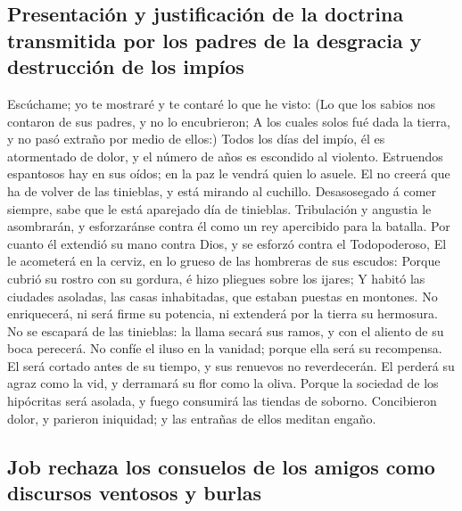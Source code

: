 \hypertarget{presentaciuxf3n-y-justificaciuxf3n-de-la-doctrina-transmitida-por-los-padres-de-la-desgracia-y-destrucciuxf3n-de-los-impuxedos}{%
\subsection{Presentación y justificación de la doctrina transmitida por
los padres de la desgracia y destrucción de los
impíos}\label{presentaciuxf3n-y-justificaciuxf3n-de-la-doctrina-transmitida-por-los-padres-de-la-desgracia-y-destrucciuxf3n-de-los-impuxedos}}

 Escúchame; yo te mostraré y te contaré lo que he visto:
 (Lo que los sabios nos contaron de sus padres, y no lo
encubrieron;  A los cuales solos fué dada la tierra, y no
pasó extraño por medio de ellos:)  Todos los días del
impío, él es atormentado de dolor, y el número de años es escondido al
violento.  Estruendos espantosos hay en sus oídos; en la
paz le vendrá quien lo asuele.  El no creerá que ha de
volver de las tinieblas, y está mirando al cuchillo. 
Desasosegado á comer siempre, sabe que le está aparejado día de
tinieblas.  Tribulación y angustia le asombrarán, y
esforzaránse contra él como un rey apercibido para la batalla.
 Por cuanto él extendió su mano contra Dios, y se esforzó
contra el Todopoderoso,  El le acometerá en la cerviz, en
lo grueso de las hombreras de sus escudos:  Porque cubrió
su rostro con su gordura, é hizo pliegues sobre los ijares;
 Y habitó las ciudades asoladas, las casas inhabitadas,
que estaban puestas en montones.  No enriquecerá, ni será
firme su potencia, ni extenderá por la tierra su hermosura.
 No se escapará de las tinieblas: la llama secará sus
ramos, y con el aliento de su boca perecerá.  No confíe
el iluso en la vanidad; porque ella será su recompensa. 
El será cortado antes de su tiempo, y sus renuevos no reverdecerán.
 El perderá su agraz como la vid, y derramará su flor
como la oliva.  Porque la sociedad de los hipócritas será
asolada, y fuego consumirá las tiendas de soborno. 
Concibieron dolor, y parieron iniquidad; y las entrañas de ellos meditan
engaño.

\hypertarget{job-rechaza-los-consuelos-de-los-amigos-como-discursos-ventosos-y-burlas}{%
\subsection{Job rechaza los consuelos de los amigos como discursos
ventosos y
burlas}\label{job-rechaza-los-consuelos-de-los-amigos-como-discursos-ventosos-y-burlas}}

